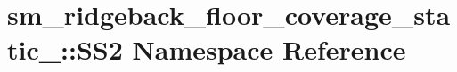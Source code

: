 \hypertarget{namespacesm__ridgeback__floor__coverage__static__1_1_1SS2}{}\section{sm\+\_\+ridgeback\+\_\+floor\+\_\+coverage\+\_\+static\+\_\+:\+:S\+S2 Namespace Reference}
\label{namespacesm__ridgeback__floor__coverage__static__1_1_1SS2}
